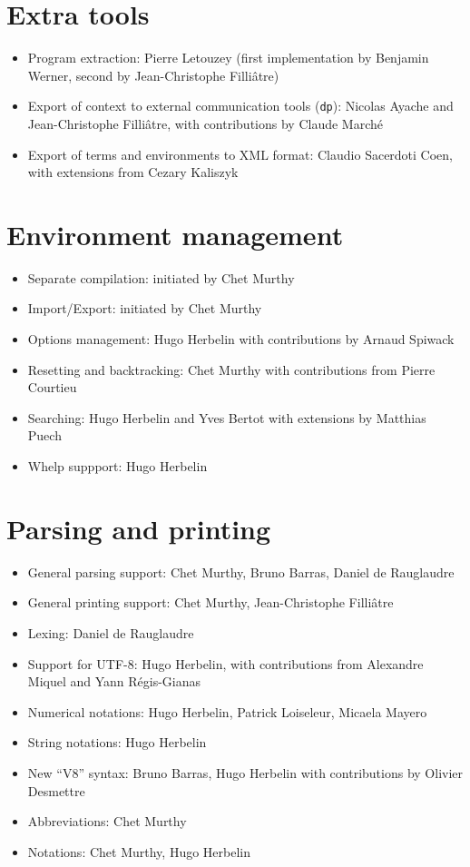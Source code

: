 \documentclass{article}
\begin{document}
\section{Extra tools}

\begin{itemize}
\item Program extraction: Pierre Letouzey (first implementation by
  Benjamin Werner, second by Jean-Christophe Filliâtre)
\item Export of context to external communication tools (\texttt{dp}):
  Nicolas Ayache and Jean-Christophe Filliâtre, with contributions by
  Claude Marché
\item Export of terms and environments to XML format: Claudio
  Sacerdoti Coen, with extensions from Cezary Kaliszyk
\end{itemize}

\section{Environment management}

\begin{itemize}
\item Separate compilation: initiated by Chet Murthy
\item Import/Export: initiated by Chet Murthy
\item Options management: Hugo Herbelin with contributions by Arnaud Spiwack
\item Resetting and backtracking: Chet Murthy with contributions from Pierre Courtieu
\item Searching: Hugo Herbelin and Yves Bertot with extensions by Matthias Puech
\item Whelp suppport: Hugo Herbelin
\end{itemize}

\section{Parsing and printing}

\begin{itemize}
\item General parsing support: Chet Murthy, Bruno Barras, Daniel de Rauglaudre
\item General printing support: Chet Murthy, Jean-Christophe Filliâtre
\item Lexing: Daniel de Rauglaudre
\item Support for UTF-8: Hugo Herbelin, with contributions from Alexandre Miquel and Yann Régis-Gianas
\item Numerical notations: Hugo Herbelin, Patrick Loiseleur, Micaela Mayero
\item String notations: Hugo Herbelin
\item New ``V8'' syntax: Bruno Barras, Hugo Herbelin with contributions by Olivier Desmettre
\item Abbreviations: Chet Murthy
\item Notations: Chet Murthy, Hugo Herbelin
\end{itemize}
\end{document}
